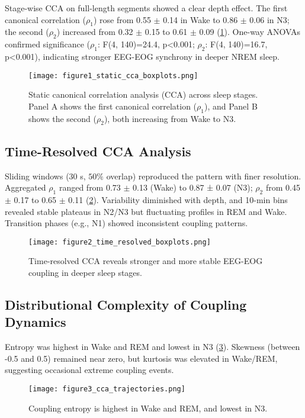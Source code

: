 Stage-wise CCA on full-length segments showed a clear depth effect. The first canonical correlation ($\rho_1$) rose from 0.55 $\pm$ 0.14 in Wake to 0.86 $\pm$ 0.06 in N3; the second ($\rho_2$) increased from 0.32 $\pm$ 0.15 to 0.61 $\pm$ 0.09 (\ref{fig:figure1}). One-way ANOVAs confirmed significance ($\rho_1$: F(4, 140)=24.4, p<0.001; $\rho_2$: F(4, 140)=16.7, p<0.001), indicating stronger EEG-EOG synchrony in deeper NREM sleep.

\begin{figure}
\centering
\texttt{[image: figure1\_static\_cca\_boxplots.png]} %
\caption{Static canonical correlation analysis (CCA) across sleep stages. Panel A shows the first canonical correlation ($\rho_1$), and Panel B shows the second ($\rho_2$), both increasing from Wake to N3.}\label{fig:figure1}
\end{figure}

\subsection{Time-Resolved CCA Analysis}

Sliding windows (30 s, $50\%$ overlap) reproduced the pattern with finer resolution. Aggregated $\rho_1$ ranged from 0.73 $\pm$ 0.13 (Wake) to 0.87 ± 0.07 (N3); $\rho_2$ from 0.45 $\pm$ 0.17 to 0.65 $\pm$ 0.11 (\ref{fig:figure2}). Variability diminished with depth, and 10-min bins revealed stable plateaus in N2/N3 but fluctuating profiles in REM and Wake. Transition phases (e.g., N1) showed inconsistent coupling patterns.

\begin{figure}
\centering
\texttt{[image: figure2\_time\_resolved\_boxplots.png]} %
\caption{Time-resolved CCA reveals stronger and more stable EEG-EOG coupling in deeper sleep stages.}\label{fig:figure2}
\end{figure}

\subsection{Distributional Complexity of Coupling Dynamics}

Entropy was highest in Wake and REM and lowest in N3 (\ref{fig:figure3}). Skewness (between -0.5 and 0.5) remained near zero, but kurtosis was elevated in Wake/REM, suggesting occasional extreme coupling events.

\begin{figure}
\centering
\texttt{[image: figure3\_cca\_trajectories.png]} %
\caption{Coupling entropy is highest in Wake and REM, and lowest in N3.}\label{fig:figure3}
\end{figure}

